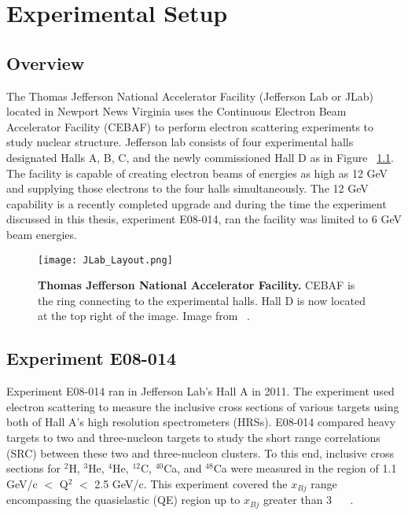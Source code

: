 \chapter{Experimental Setup} %
\label{ch:experiment} %

\section{Overview}
\label{sec:overview}

The Thomas Jefferson National Accelerator Facility (Jefferson Lab or JLab) located in Newport News Virginia uses the Continuous Electron Beam Accelerator Facility (CEBAF) to perform electron scattering experiments to study nuclear structure. Jefferson lab consists of four experimental halls designated Halls A, B, C, and the newly commissioned Hall D as in Figure ~\ref{fig:jlab}. The facility is capable of creating electron beams of energies as high as 12 GeV and supplying those electrons to the four halls simultaneously. The 12 GeV capability is a recently completed upgrade and during the time the experiment discussed in this thesis, experiment E08-014, ran the facility was limited to 6 GeV beam energies.  

\begin{figure}[!ht]
\begin{center}
\texttt{[image: JLab\_Layout.png]}
\end{center}
\caption[Thomas Jefferson National Accelerator Facility]{
{\bf{Thomas Jefferson National Accelerator Facility.}} CEBAF is the ring connecting to the experimental halls. Hall D is now located at the top right of the image. Image from ~\cite{Article:HallA}.}
\label{fig:jlab}
\end{figure}

\section{Experiment E08-014}
\label{sec:x>2}
Experiment E08-014 ran in Jefferson Lab's Hall A in 2011. The experiment used electron scattering to measure the inclusive cross sections of various targets using both of Hall A's high resolution spectrometers (HRSs). E08-014 compared heavy targets to two and three-nucleon targets to study the short range correlations (SRC) between these two and three-nucleon clusters. To this end, inclusive cross sections for $^2$H, $^3$He, $^4$He, $^{12}$C, $^{40}$Ca, and $^{48}$Ca were measured in the region of 1.1 GeV/c $<$ Q$^2$ $<$ 2.5 GeV/c. This experiment covered the $x_{Bj}$ range encompassing the quasielastic (QE) region up to $x_{Bj}$ greater than 3 ~\cite{Thesis:Ye} ~\cite{src_website}. 

